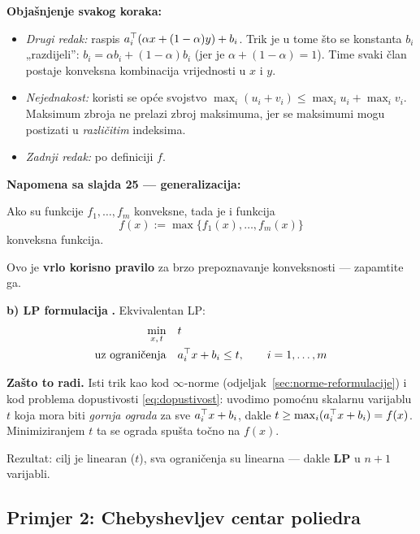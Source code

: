 \textbf{Objašnjenje svakog koraka:}

\begin{itemize}
  \item \emph{Drugi redak:} raspis $a_i\T(\alpha x + (1-\alpha)y) + b_i$. Trik
        je u tome što se konstanta $b_i$ „razdijeli”:
        $b_i = \alpha b_i + (1-\alpha)b_i$ (jer je $\alpha + (1-\alpha) = 1$).
        Time svaki član postaje konveksna kombinacija vrijednosti u $x$ i $y$.
  \item \emph{Nejednakost:} koristi se opće svojstvo
        $\max_i(u_i + v_i) \le \max_i u_i + \max_i v_i$. Maksimum zbroja ne
        prelazi zbroj maksimuma, jer se maksimumi mogu postizati u
        \emph{različitim} indeksima.
  \item \emph{Zadnji redak:} po definiciji $f$.
\end{itemize}

\textbf{Napomena sa slajda 25 --- generalizacija:}

\begin{teorem}
Ako su funkcije $f_1, \dots, f_m$ konveksne, tada je i funkcija
\[
f(x) := \max\{f_1(x), \dots, f_m(x)\}
\]
konveksna funkcija.
\end{teorem}

Ovo je \textbf{vrlo korisno pravilo} za brzo prepoznavanje konveksnosti ---
zapamtite ga.

\textbf{b) LP formulacija} \textbf{.} Ekvivalentan LP:
\[
\begin{aligned}
\min_{x,\,t} \quad & t \\
\uzogr & a_i\T x + b_i \le t, \qquad i = 1,\dots,m
\end{aligned}
\]

\textbf{Zašto to radi.} Isti trik kao kod $\infty$-norme
(odjeljak~\ref{sec:norme-reformulacije}) i kod problema dopustivosti \eqref{eq:dopustivost}: uvodimo
pomoćnu skalarnu varijablu $t$ koja mora biti \emph{gornja ograda} za sve
$a_i\T x + b_i$, dakle $t \ge \max_i(a_i\T x + b_i) = f(x)$. Minimiziranjem $t$
ta se ograda spušta točno na $f(x)$.

Rezultat: cilj je linearan ($t$), sva ograničenja su linearna --- dakle
\textbf{LP} u $n+1$ varijabli.

\subsection{Primjer 2: Chebyshevljev centar poliedra}
\label{sec:chebyshev}

